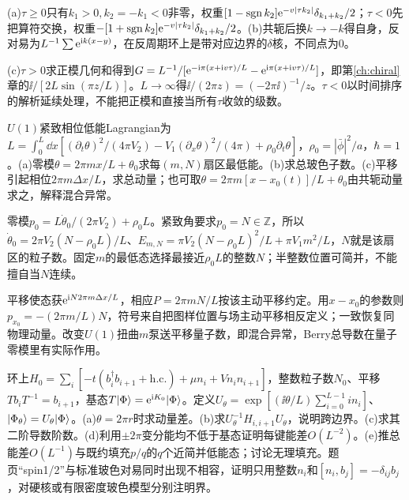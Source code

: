 \begin{solution}
(a)$\tau\ge0$只有$k_1>0,k_2=-k_1<0$非零，权重$[1-\operatorname{sgn}k_2]\mathrm e^{-v|\tau k_2|}\delta_{k_1+k_2}/2$；$\tau<0$先把算符交换，权重$-[1+\operatorname{sgn}k_2]\mathrm e^{-v|\tau k_2|}\delta_{k_1+k_2}/2$。(b)共轭后换$k\to-k$得自身，反对易为$L^{-1}\sum\mathrm e^{\mathrm i k(x-y)}$，在反周期环上是带对应边界的$\delta$核，不同点为0。

(c)$\tau>0$求正模几何和得到$G=L^{-1}/[\mathrm e^{-\mathrm i\pi(x+\mathrm i v\tau)/L}-\mathrm e^{\mathrm i\pi(x+\mathrm i v\tau)/L}]$，即第\ref{ch:chiral}章的$\ii/[2L\sin(\pi z/L)]$。$L\to\infty$得$\ii/(2\pi z)=(-2\pi\ii)^{-1}/z$。$\tau<0$以时间排序的解析延续处理，不能把正模和直接当所有$\tau$收敛的级数。
\end{solution}
\begin{exercise}[原题1(a)--(c)]
$U(1)$紧致相位低能Lagrangian为$L=\int_0^L\dd x[(\partial_t\theta)^2/(4\pi V_2)-V_1(\partial_x\theta)^2/(4\pi)+\rho_0\partial_t\theta]$，$\rho_0=|\bar\phi|^2/a$，$\hbar=1$。(a)零模$\theta=2\pi mx/L+\theta_0$求每$(m,N)$扇区最低能。(b)求总玻色子数。(c)平移引起相位$2\pi m\Delta x/L$，求总动量；也可取$\theta=2\pi m[x-x_0(t)]/L+\theta_0$由共轭动量求之，解释混合异常。
\end{exercise}
\begin{solution}
零模$p_0=L\dot\theta_0/(2\pi V_2)+\rho_0L$。紧致角要求$p_0=N\in\mathbb Z$，所以$\dot\theta_0=2\pi V_2(N-\rho_0L)/L$、$E_{m,N}=\pi V_2(N-\rho_0L)^2/L+\pi V_1m^2/L$，$N$就是该扇区的粒子数。固定$m$的最低态选择最接近$\rho_0L$的整数$N$；半整数位置可简并，不能擅自当$N$连续。

平移使态获$\mathrm e^{\mathrm i N2\pi m\Delta x/L}$，相应$P=2\pi mN/L$按该主动平移约定。用$x-x_0$的参数则$p_{x_0}=-(2\pi m/L)N$，符号来自把图样位置与场主动平移相反定义；一致恢复同物理动量。改变$U(1)$扭曲$m$泵送平移量子数，即混合异常，Berry总导数在量子零模里有实际作用。
\end{solution}
\begin{exercise}[原题2(a)--(e)]
环上$H_0=\sum_i[-t(b_i^\dagger b_{i+1}+\mathrm{h.c.})+\mu n_i+Vn_in_{i+1}]$，整数粒子数$N_0$、平移$Tb_iT^{-1}=b_{i+1}$，基态$T\lvert \Phi\rangle=\mathrm e^{\mathrm i K_0}\lvert \Phi\rangle$。定义$U_\theta=\exp[(\ii\theta/L)\sum_{i=0}^{L-1}in_i]$、$\lvert \Phi_\theta\rangle=U_\theta\lvert \Phi\rangle$。(a)$\theta=2\pi r$时求动量差。(b)求$U_\theta^{-1}H_{i,i+1}U_\theta$，说明跨边界。(c)求其二阶导数阶数。(d)利用$\pm2\pi$变分能均不低于基态证明每键能差$O(L^{-2})$。(e)推总能差$O(L^{-1})$与既约填充$p/q$的$q$个近简并低能态；讨论无理填充。题页“spin1/2”与标准玻色对易同时出现不相容，证明只用整数$n_i$和$[n_i,b_j]=-\delta_{ij}b_j$，对硬核或有限密度玻色模型分别注明界。
\end{exercise}

